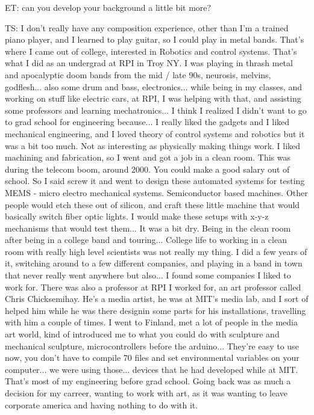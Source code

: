 ET: can you develop your background a little bit more?

TS: I don't really have any composition experience, other than I'm a trained piano player, and I learned to play guitar, so I could play in metal bands. That's where I came out of college, interested in Robotics and control systems. That's what I did as an undergrad at RPI in Troy NY. I was playing in thrash metal and apocalyptic doom bands from the mid / late 90s, neurosis, melvins, godflesh... also some drum and bass, electronics... while being in my classes, and working on stuff like electric cars, at RPI, I was helping with that, and assisting some professors and learning mechatronics... I think I realized I didn't want to go to grad school for engineering because... I really liked the gadgets and I liked mechanical engineering, and I loved theory of control systems and robotics but it was a bit too much. Not as interesting as physically making things work. I liked machining and fabrication, so I went and got a job in a clean room. This was during the telecom boom, around 2000. You could make a good salary out of school. So I said screw it and went to design these automated systems for testing MEMS - micro electro mechanical systems. Semiconductor based machines. Other people would etch these out of silicon, and craft these little machine that would basically switch fiber optic lights. I would make these setups with x-y-z mechanisms that would test them... It was a bit dry. Being in the clean room after being in a college band and touring... College life to working in a clean room with really high level scientists was not really my thing. I did a few years of it, switching around to a few different companies, and playing in a band in town that never really went anywhere but also... I found some companies I liked to work for. There was also a professor at RPI I worked for, an art professor called Chris Chicksemihay. He's a media artist, he was at MIT's media lab, and I sort of helped him while he was there designin some parts for his installations, travelling with him a couple of times. I went to Finland, met a lot of people in the media art world, kind of introduced me to what you could do with sculpture and mechanical sculpture, microcontrollers before the arduino... They're easy to use now, you don't have to compile 70 files and set environmental variables on your computer... we were using those... devices that he had developed while at MIT. That's most of my engineering before grad school. Going back was as much a decision for my carreer, wanting to work with art, as it was wanting to leave corporate america and having nothing to do with it. 


